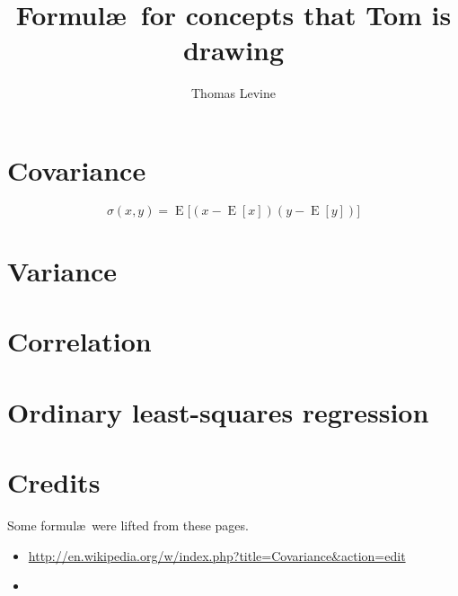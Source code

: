 \documentclass{article}
\title{Formul\ae\ for concepts that Tom is drawing}
\author{Thomas Levine}
\begin{document}
\maketitle
\section{Covariance}
$$\sigma\left(x,y\right) = \operatorname{E}{\big[(x - \operatorname{E}[x])(y - \operatorname{E}[y])\big]} $$


\section{Variance}
\section{Correlation}
\section{Ordinary least-squares regression}

\section{Credits}
Some formul\ae\ were lifted from these pages.
\begin{itemize}
\item \url{http://en.wikipedia.org/w/index.php?title=Covariance&action=edit}
\item \url{}
\end{itemize}
\end{document}
